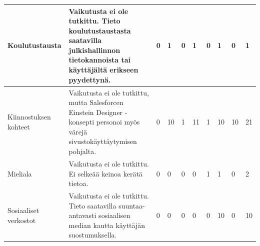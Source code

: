 \documentclass[finnish, 12pt, a4paper, elec, utf8, a-1b, online]{aaltothesis}
\begin{document}
{\begin{longtable}{p{2.5cm}|p{6cm}|p{0.5cm}p{0.5cm}p{0.5cm}|p{0.5cm}|p{0.5cm}p{0.5cm}p{0.5cm}|p{0.5cm}|}
    \midrule
    Koulutustausta                         & Vaikutusta ei ole tutkittu. Tieto koulutustaustasta saatavilla julkishallinnon tietokannoista tai käyttäjältä erikseen pyydettynä.                                                                                                                                                                                   & 0                                          & 1                                   & 0                                      & 1                            & 0                                               & 1                                         & 0                                         & 1                            \\
    \midrule
    Kiinnostuksen kohteet                  & Vaikutusta ei ole tutkittu, mutta Salesforcen Einstein Designer -konsepti personoi myös värejä sivustokäyttäytymisen pohjalta.                                                                                                                                                                                       & 0                                          & 10                                  & 1                                      & 11                           & 1                                               & 10                                        & 10                                        & 21                           \\
    \midrule
    Mieliala                               & Vaikutusta ei ole tutkittu. Ei selkeää keinoa kerätä tietoa.                                                                                                                                                                                                                                                         & 0                                          & 0                                   & 0                                      & 0                            & 1                                               & 1                                         & 0                                         & 2                            \\
    \midrule
    Sosiaaliset verkostot                  & Vaikutusta ei ole tutkittu. Tieto saatavilla suuntaa-antavasti sosiaalisen median kautta käyttäjän suostumuksella.                                                                                                                                                                                                   & 0                                          & 0                                   & 0                                      & 0                            & 0                                               & 10                                        & 0                                         & 10                           \\

\end{longtable}}
\end{document}
